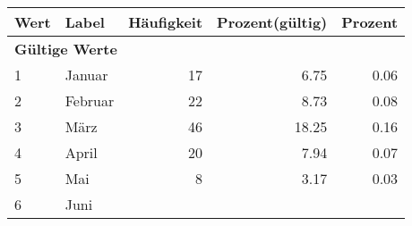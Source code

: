      \begin{longtable}{lXrrr}
     \toprule
     \textbf{Wert} & \textbf{Label} & \textbf{Häufigkeit} & \textbf{Prozent(gültig)} & \textbf{Prozent} \\
     \endhead
     \midrule
     \multicolumn{5}{l}{\textbf{Gültige Werte}}\\

     1 &
     \multicolumn{1}{X}{ Januar   } &


       \num{17} &
       \num[round-mode=places,round-precision=2]{6,75} &
         \num[round-mode=places,round-precision=2]{0,06} \\

     2 &
     \multicolumn{1}{X}{ Februar   } &


       \num{22} &
       \num[round-mode=places,round-precision=2]{8,73} &
         \num[round-mode=places,round-precision=2]{0,08} \\

     3 &
     \multicolumn{1}{X}{ März   } &


       \num{46} &
       \num[round-mode=places,round-precision=2]{18,25} &
         \num[round-mode=places,round-precision=2]{0,16} \\

     4 &
     \multicolumn{1}{X}{ April   } &


       \num{20} &
       \num[round-mode=places,round-precision=2]{7,94} &
         \num[round-mode=places,round-precision=2]{0,07} \\

     5 &
     \multicolumn{1}{X}{ Mai   } &


       \num{8} &
       \num[round-mode=places,round-precision=2]{3,17} &
         \num[round-mode=places,round-precision=2]{0,03} \\

     6 &
     \multicolumn{1}{X}{ Juni   } &



\end{longtable}
